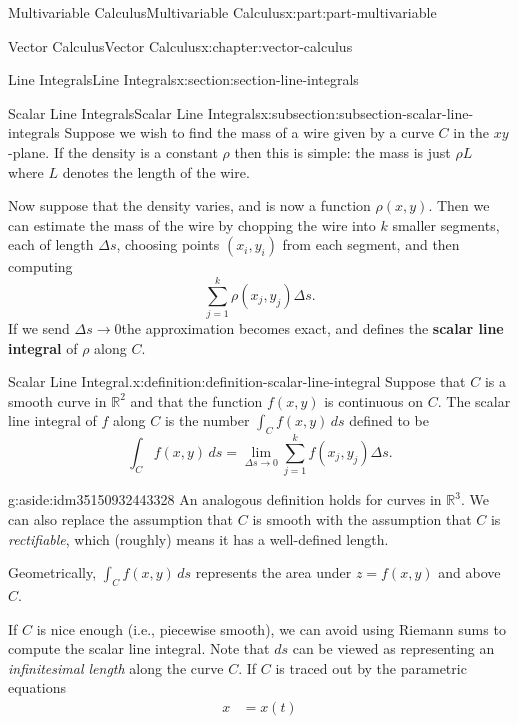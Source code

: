 \documentclass[twoside,10pt,]{tufte-book}
\newcommand{\terminology}[1]{\textbf{#1}}
\numberwithin{equation}{part}
\newcommand{\RR}{\mathbb{R}}
\newcommand{\amp}{&}
\begin{document}
\begin{partptx}{Multivariable Calculus}{}{Multivariable Calculus}{}{}{x:part:part-multivariable}
\begin{chapterptx}{Vector Calculus}{}{Vector Calculus}{}{}{x:chapter:vector-calculus}
\begin{sectionptx}{Line Integrals}{}{Line Integrals}{}{}{x:section:section-line-integrals}
\typeout{************************************************}
%
\begin{subsectionptx}{Scalar Line Integrals}{}{Scalar Line Integrals}{}{}{x:subsection:subsection-scalar-line-integrals}
Suppose we wish to find the mass of a wire given by a curve \(C\) in the \(xy\)-plane. If the density is a constant \(\rho\) then this is simple: the mass is just \(\rho L\) where \(L\) denotes the length of the wire.%
\par
Now suppose that the density varies, and is now a function \(\rho(x,y)\). Then we can estimate the mass of the wire by chopping the wire into \(k\) smaller segments, each of length \(\Delta s\), choosing points \((x_{i},y_{i})\) from each segment, and then computing%
\begin{equation*}
\sum_{j=1}^{k}\rho(x_{j}, y_{j})\Delta s\text{.}
\end{equation*}
If we send \(\Delta s\to 0\)the approximation becomes exact, and defines the \terminology{scalar line integral} of \(\rho\) along \(C\).%
\begin{definition}{Scalar Line Integral.}{x:definition:definition-scalar-line-integral}%
%
Suppose that \(C\) is a smooth curve in \(\RR^{2}\) and that the function \(f(x,y)\) is continuous on \(C\). The scalar line integral of \(f\) along \(C\) is the number \(\int_{C}f(x,y)\,ds\) defined to be%
\begin{equation*}
\int_{C}f(x,y)\,ds = \lim_{\Delta s\to 0}\sum_{j=1}^{k}f(x_{j},y_{j})\Delta s\text{.}
\end{equation*}
%
\begin{aside}{}{g:aside:idm35150932443328}%
An analogous definition holds for curves in \(\RR^{3}\). We can also replace the assumption that \(C\) is smooth with the assumption that \(C\) is \emph{rectifiable}, which (roughly) means it has a well-defined length.%
\end{aside}
\end{definition}
Geometrically, \(\int_{C}f(x,y)\,ds\) represents the area under \(z = f(x,y)\) and above \(C\).%
\par
If \(C\) is nice enough (i.e., piecewise smooth), we can avoid using Riemann sums to compute the scalar line integral. Note that \(ds\) can be viewed as representing an \emph{infinitesimal length} along the curve \(C\). If \(C\) is traced out by the parametric equations%
\begin{align*}
x \amp = x(t) \\

\end{align*}
\end{subsectionptx}
\end{sectionptx}
\end{chapterptx}
\end{partptx}
\end{document}
